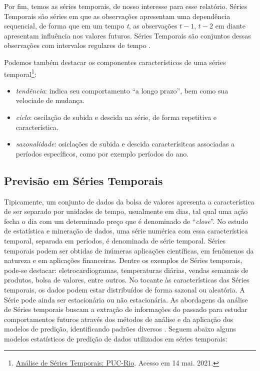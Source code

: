 \par
Por fim, temos as séries temporais, de nosso interesse para esse relatório. Séries Temporais são séries em que as observações apresentam uma dependência sequencial, de forma que em um tempo \textit{t}, as observações $\textit{t}-1$, $\textit{t}-2$ em diante apresentam influência nos valores futuros. Séries Temporais são conjuntos dessas observações com intervalos regulares de tempo \cite{jason}.

\par
Podemos também destacar os componentes característicos de uma séries temporal\footnote{\href{https://www.maxwell.vrac.puc-rio.br/4244/4244_5.PDF}{Análise de Séries Temporais: PUC-Rio}. Acesso em 14 mai. 2021.}:

\begin{itemize}
    \small
    \item{\textit{tendência}: indica seu comportamento ``a longo prazo'', bem como sua velociade de mudança.}
    \item{\textit{ciclo}: oscilação de subida e descida na série, de forma repetitiva e característica.}
    \item{\textit{sazonalidade}: osiclações de subida e descida caracterísitcas associadas a períodos específicos, como por exemplo períodos do ano.}
\end{itemize}

\subsection{\textbf{Previsão em Séries Temporais}}

\par
Tipicamente, um conjunto de dados da bolsa de valores apresenta a característica de ser separado por unidades de tempo, usualmente em dias, tal qual uma ação fecha o dia com um determinado preço que é denominado de “\textit{close}”. No estudo de estatística e mineração de dados, uma série numérica com essa característica temporal, separada em períodos, é denominada de série temporal. Séries temporais podem ser obtidas de inúmeras aplicações científicas, em fenômenos da natureza e em aplicações financeiras. Dentre os exemplos de Séries temporais, pode-se destacar: eletrocardiogramas, temperaturas diárias, vendas semanais de produtos, bolsa de valores, entre outros. No tocante às características das Séries temporais, os dados podem estar distribuídos de forma sazonal ou aleatória. A Série pode ainda ser estacionária ou não estacionária. As abordagens da análise de Séries temporais buscam a extração de informações do passado para estudar comportamentos futuros através dos métodos de análise e da aplicação dos modelos de predição, identificando padrões diversos \cite{fu2011}. Seguem abaixo alguns modelos estatísticos de predição de dados utilizados em séries temporais:

